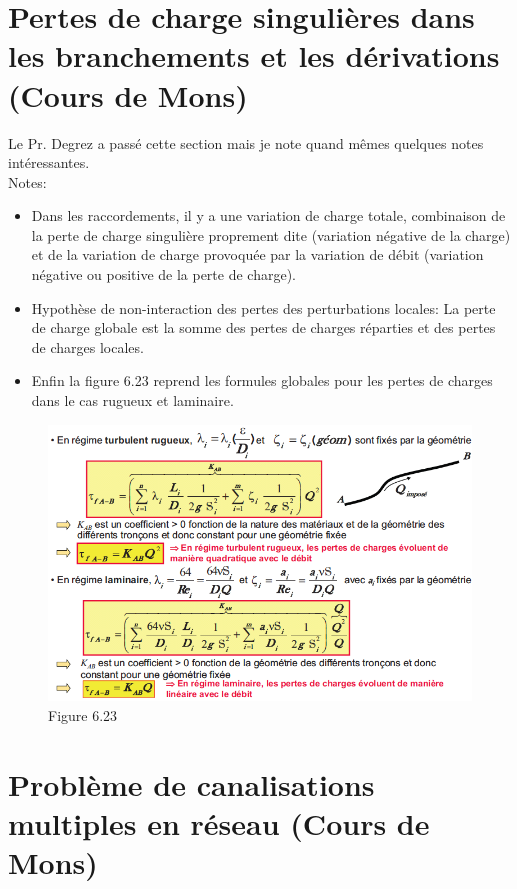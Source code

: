 \section{Pertes de charge singulières dans les branchements et les dérivations (Cours de Mons)}

Le Pr. Degrez a passé cette section mais je note quand mêmes quelques notes intéressantes.
\\

Notes:
\begin{itemize}
\item Dans les raccordements, il y a une variation de charge totale, combinaison de la perte de charge singulière proprement dite (variation négative de la charge) et de la variation de charge provoquée par la variation de débit (variation négative ou positive de la perte de charge).
\item Hypothèse de non-interaction des pertes des perturbations locales: La perte de charge globale est la somme des pertes de charges réparties et des pertes de charges locales.
\item Enfin la figure 6.23 reprend les formules globales pour les pertes de charges dans le cas rugueux et laminaire.
\\
\end{itemize}

\begin{figure}[H]
\begin{center}
\includegraphics[scale=0.5]{ch6/85.png}
\caption*{Figure 6.23}
\end{center}
\end{figure}


\section{Problème de canalisations multiples en réseau (Cours de Mons)}

